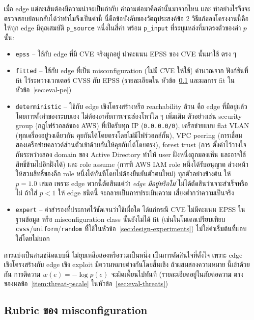 เมื่อ edge แต่ละเส้นต้องมีความน่าจะเป็นกำกับ คำถามต่อมาคือค่านั้นมาจากไหน และ
ทำอย่างไรจึงจะตรวจสอบย้อนกลับได้ว่าทำไมจึงเป็นค่านี้ นี่คือข้อบังคับของวัตถุประสงค์ข้อ 2
วิธีแก้ของโครงงานนี้คือให้ทุก edge มีคุณสมบัติ \texttt{p\_source} หนึ่งในสี่ค่า พร้อม
\texttt{p\_input} ที่ระบุแหล่งที่มาตรงตัวของค่า $p$ นั้น:

\begin{itemize}[leftmargin=1.6em]
\item \texttt{epss} -- ใช้กับ edge ที่มี CVE จริงผูกอยู่ นำคะแนน EPSS ของ CVE นั้นมาใช้
ตรง ๆ
\item \texttt{fitted} -- ใช้กับ edge ที่เป็น misconfiguration (ไม่มี CVE ให้ใช้) คำนวณจาก
ฟังก์ชันที่ fit ไว้ระหว่างเวกเตอร์ CVSS กับ EPSS (รายละเอียดใน
หัวข้อ~\ref{sec:design-rubric} และผลการ fit ในหัวข้อ~\ref{sec:eval-pe})
\item \texttt{deterministic} -- ใช้กับ edge เชิงโครงสร้างหรือ reachability ล้วน คือ edge
ที่มีอยู่แล้วโดยการตั้งค่าของระบบเอง ไม่ต้องอาศัยการเจาะช่องโหว่ใด ๆ เพิ่มเติม ตัวอย่างเช่น
security group (กฎไฟร์วอลล์ของ AWS) ที่เปิดรับทุก IP (\texttt{0.0.0.0/0}), เครือข่ายแบบ
flat VLAN (ทุกเครื่องอยู่วงเดียวกัน คุยกันได้โดยตรงโดยไม่มีไฟร์วอลล์กั้น), VPC peering
(การเชื่อมสองเครือข่ายคลาวด์ส่วนตัวเข้าด้วยกันให้คุยกันได้โดยตรง), forest trust (การ
ตั้งค่าไว้วางใจกันระหว่างสอง domain ของ Active Directory ทำให้ user ฝั่งหนึ่งถูกมองเห็น
และอาจใช้สิทธิ์ข้ามไปอีกฝั่งได้) และ role assume (การที่ AWS IAM role หนึ่งได้รับอนุญาต
ล่วงหน้าให้สวมสิทธิ์ของอีก role หนึ่งได้ทันทีโดยไม่ต้องยืนยันตัวตนใหม่) ทุกตัวอย่างข้างต้น
ให้ $p=1.0$ เสมอ เพราะ edge พวกนี้ตัดสินแค่ว่า \emph{edge มีอยู่หรือไม่}
ไม่ได้ตัดสินว่าเจาะสำเร็จหรือไม่ ถ้าใส่ $p<1$ ให้ edge ชนิดนี้ จะกลายเป็นการประเมินความ
เสี่ยงต่ำกว่าความเป็นจริง
\item \texttt{expert} -- ค่าสำรองที่ประกาศไว้ชัดเจนว่าใช้เมื่อใด ได้แก่กรณี CVE ไม่มีคะแนน
EPSS ในฐานข้อมูล หรือ misconfiguration class นั้นยังไม่ได้ fit (เช่นในโมเดลเปรียบเทียบ
\texttt{cvss}/\texttt{uniform}/\texttt{random} ที่ใช้ในหัวข้อ~\ref{sec:design-experiments})
ไม่ใช่ค่าเริ่มต้นที่แอบใส่โดยไม่บอก
\end{itemize}

การแบ่งเป็นสามชนิดแบบนี้ ไม่ยุบเหลือสองหรือรวมเป็นหนึ่ง เป็นการตัดสินใจที่ตั้งใจ เพราะ
edge เชิงโครงสร้างกับ edge เชิง exploit มีความหมายต่างกันโดยสิ้นเชิง ถ้าผสมสองความหมาย
นี้เข้าด้วยกัน การตีความ $w(e)=-\log p(e)$ จะผิดเพี้ยนไปทันที (รายละเอียดอยู่ในภัยต่อความ
ตรงของผลข้อ~\ref{item:threat-pscale} ในหัวข้อ~\ref{sec:eval-threats})

\subsection{Rubric ของ misconfiguration}\label{sec:design-rubric}

